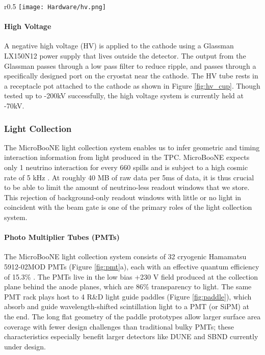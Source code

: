 \begin{wrapfigure}{r}{0.5\textwidth}
\centering
\texttt{[image: Hardware/hv.png]}
\caption{ MicroBooNE HV feedthrough resting in the receptacle cup attached to the cathode. } 
\label{fig:hv_cup}
\end{wrapfigure}

\paragraph{High Voltage}
\par A negative high voltage (HV) is applied to the cathode using a Glassman LX150N12 power supply that lives outside the detector.  The output from the Glassman passes through a low pass filter to reduce ripple, and passes through a specifically designed port on the cryostat near the cathode.  The HV tube rests in a receptacle pot attached to the cathode as shown in Figure \ref{fig:hv_cup}.
\noindent Though tested up to -200kV successfully, the high voltage system is currently held at -70kV.

\subsubsection{Light Collection} \label{subsec:lightCollection}
\par The MicroBooNE light collection system enables us to infer geometric and timing interaction information from light produced in the TPC. MicroBooNE expects only 1 neutrino interaction for every 660 spills and is subject to a high cosmic rate of 5 kHz \cite{bib:first_nus}.  At roughly 40 MB of raw data per 5ms of data, it is thus crucial to be able to limit the amount of neutrino-less readout windows that we store. This rejection of background-only readout windows with little or no light in coincident with the beam gate is one of the primary roles of the light collection system.

\paragraph{Photo Multiplier Tubes (PMTs)}

\par The MicroBooNE light collection system consists of 32 cryogenic Hamamatsu 5912-02MOD PMTs (Figure \ref{fig:pmt}a), each with an effective quantum efficiency of 15.3\% \cite{bib:ben_jones}. The PMTs live in the low bias +230 V field produced at the collection plane behind the anode planes, which are 86\% transparency to light.  The same PMT rack plays host to 4 R\&D light guide paddles (Figure \ref{fig:paddle}), which absorb and guide wavelength-shifted scintillation light to a PMT (or SiPM) at the end. The long flat geometry of the paddle prototypes allow larger surface area coverage with fewer design challenges than traditional bulky PMTs; these characteristics especially benefit larger detectors like DUNE and SBND currently under design.  

